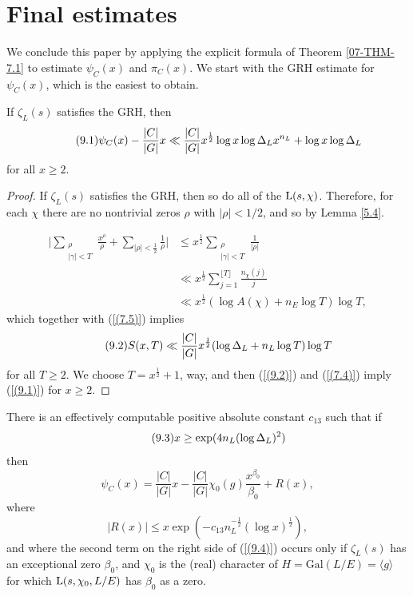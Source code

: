 \documentclass[./main]{subfiles}
\begin{document}
\section{Final estimates}

We conclude this paper by applying the explicit formula of Theorem \ref{07-THM-7.1} to estimate $\psi_C(x)$ and $\pi_C(x)$.
We start with the GRH estimate for $\psi_C(x)$, which is the easiest to obtain.

\begin{theorem}\label{09-THM-9.1}
If $\zeta_L(s)$ satisfies the GRH, then 
\[\tag{9.1}\label{(9.1)}
\psi_C(x) - \frac{|C|}{|G|} x \ll \frac{|C|}{|G|} x^{\frac{1}{2}} \log x \log \Delta_L x^{n_L} + \log x \log \Delta_L 
\]
for all $x \geq 2$.
\end{theorem}
\begin{proof}
If $\zeta_L(s)$ satisfies the GRH, then so do all of the $\operatorname{L}(s, \chi)$.
Therefore, for each $\chi$ there are no nontrivial zeros $\rho$ with $|\rho| < 1/2$, and so by Lemma \ref{5.4}.

\begin{align*}
    \Bigg| \sum_{\substack{\rho \\ |\gamma| < T}} \frac{x^\rho}{\rho} + \sum_{|\rho| < \frac{1}{2}} \frac{1}{\rho} \Bigg| & \leq x^{\frac{1}{2}} \sum_{\substack{\rho \\ |\gamma| < T}} \frac{1}{|\rho|} \\
    & \ll x^{\frac{1}{2}} \sum_{j=1}^{\lfloor T\rfloor} \frac{n_\chi(j)}{j} \\
    & \ll x^{\frac{1}{2}} (\log A(\chi) + n_E \log T)\log T,
\end{align*}
which together with (\ref{(7.5)}) implies 
\[\tag{9.2}\label{(9.2)}
S(x, T) \ll \frac{|C|}{|G|} x^{\frac{1}{2}} (\log \Delta_L  + n_L \log T) \log T
\]
for all $T \geq 2$.
We choose $T = x^\frac{1}{2} + 1$, way, and then (\ref{(9.2)}) and (\ref{(7.4)}) imply (\ref{(9.1)}) for $x \geq 2$.
\end{proof}

\begin{theorem}\label{09-THM-9.2}
There is an effectively computable positive absolute constant $c_{13}$ such that if 
\[\tag{9.3}\label{(9.3)}
x \geq \exp(4n_L (\log \Delta_L )^2)
\]
then
\[\tag{9.4}\label{(9.4)}
\psi_C(x) = \frac{|C|}{|G|}x - \frac{|C|}{|G|} \chi_0(g) \frac{x^{\beta_0}}{\beta_0} + R(x),
\]
where
\[
|R(x)| \leq x \exp(-c_{13} n_{L}^{-\frac{1}{2}} (\log x)^\frac{1}{2}),
\]
and where the second term on the right side of (\ref{(9.4)}) occurs only if $\zeta_L(s)$ has an exceptional zero $\beta_0$, and $\chi_0$ is the (real) character of $H = \mathrm{Gal}(L/E) = \langle g \rangle$ for which $\operatorname{L}(s, \chi_0, L/E)$ has $\beta_0$ as a zero.
\end{theorem}
\end{document}

